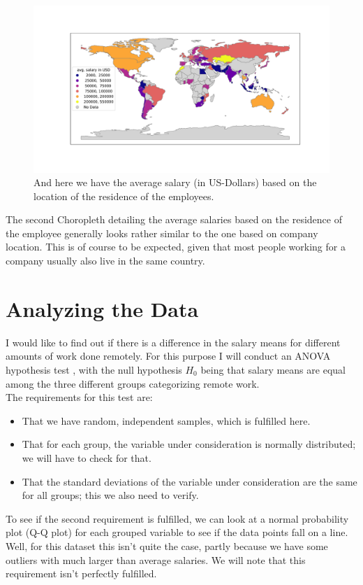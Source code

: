 \documentclass{article}
\begin{document}
\begin{figure}[h!]
  \centering
  \includegraphics[scale=0.38]{fig/salaries_employee_loc.pdf}
  \caption{And here we have the average salary (in US-Dollars) based on the location of the residence of the employees.}
\end{figure}

The second Choropleth detailing the average salaries based on the residence of the employee generally looks rather similar to the one based on company location. This is of course to be expected, given that most people working for a company usually also live in the same country.

\section{Analyzing the Data}
I would like to find out if there is a difference in the salary means for different amounts of work done remotely. For this purpose I will conduct an ANOVA hypothesis test \citep{ANOVA}, with the null hypothesis $H_0$ being that salary means are equal among the three different groups categorizing remote work. \\
The requirements for this test are:
\begin{itemize}
\item That we have random, independent samples, which is fulfilled here.
\item That for each group, the variable under consideration is normally distributed; we will have to check for that.
\item That the standard deviations of the variable under consideration are the same for all groups; this we also need to verify.
\end{itemize} 
To see if the second requirement is fulfilled, we can look at a normal probability plot (Q-Q plot) for each grouped variable to see if the data points fall on a line. Well, for this dataset this isn't quite the case, partly because we have some outliers with much larger than average salaries. We will note that this requirement isn't perfectly fulfilled.
\end{document}
